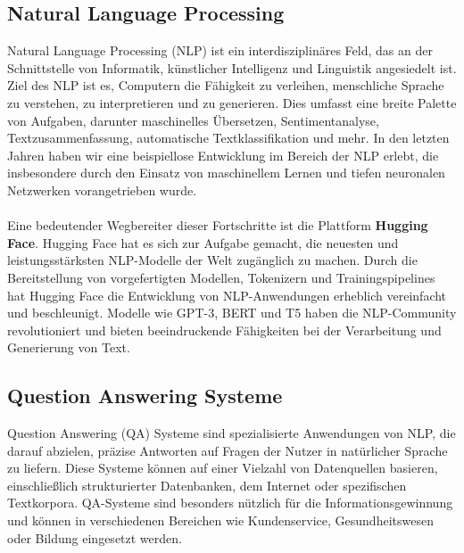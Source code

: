 \documentclass[12pt, a4paper]{article}
\begin{document}
\subsection{Natural Language Processing}
Natural Language Processing (NLP) ist ein interdisziplinäres Feld, das an der Schnittstelle von Informatik, künstlicher Intelligenz und Linguistik angesiedelt ist. Ziel des NLP ist es, Computern die Fähigkeit zu verleihen, menschliche Sprache zu verstehen, zu interpretieren und zu generieren. Dies umfasst eine breite Palette von Aufgaben, darunter maschinelles Übersetzen, Sentimentanalyse, Textzusammenfassung, automatische Textklassifikation und mehr. In den letzten Jahren haben wir eine beispiellose Entwicklung im Bereich der NLP erlebt, die insbesondere durch den Einsatz von maschinellem Lernen und tiefen neuronalen Netzwerken vorangetrieben wurde.
\\ \\
Eine bedeutender Wegbereiter dieser Fortschritte ist die Plattform \textbf{Hugging Face}. Hugging Face hat es sich zur Aufgabe gemacht, die neuesten und leistungsstärksten NLP-Modelle der Welt zugänglich zu machen. Durch die Bereitstellung von vorgefertigten Modellen, Tokenizern und Trainingspipelines hat Hugging Face die Entwicklung von NLP-Anwendungen erheblich vereinfacht und beschleunigt. Modelle wie GPT-3, BERT und T5 haben die NLP-Community revolutioniert und bieten beeindruckende Fähigkeiten bei der Verarbeitung und Generierung von Text.
\subsection{Question Answering Systeme}
Question Answering (QA) Systeme sind spezialisierte Anwendungen von NLP, die darauf abzielen, präzise Antworten auf Fragen der Nutzer in natürlicher Sprache zu liefern. Diese Systeme können auf einer Vielzahl von Datenquellen basieren, einschließlich strukturierter Datenbanken, dem Internet oder spezifischen Textkorpora. QA-Systeme sind besonders nützlich für die Informationsgewinnung und können in verschiedenen Bereichen wie Kundenservice, Gesundheitswesen oder Bildung eingesetzt werden.
\end{document}
